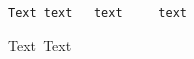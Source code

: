 \documentclass[a4paper]{article}
\begin{document}
\begin{lstlisting}
Text text	text	 text
\end{lstlisting}

Text\lstinline[columns=fixed]| |Text
\end{document}
